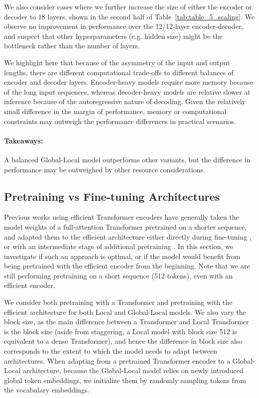 \documentclass[11pt]{article}
\begin{document}
We also consider cases where we further increase the size of either the encoder or decoder to 18 layers, shown in the second half of Table~\ref{tab:table_5_scaling}.
We observe no improvement in performance over the 12/12-layer encoder-decoder, and suspect that other hyperparameters (e.g. hidden size) might be the bottleneck rather than the number of layers.

We highlight here that because of the asymmetry of the input and output lengths, there are different computational trade-offs to different balances of encoder and decoder layers. 
Encoder-heavy models require more memory because of the long input sequences, whereas decoder-heavy models are relative slower at inference because of the autoregressive nature of decoding.
Given the relatively small difference in the margin of performance, memory or computational constraints may outweigh the performance differences in practical scenarios.

\paragraph{Takeaways:} A balanced Global-Local model outperforms other variants, but the difference in performance may be outweighed by other resource considerations.




\subsection{Pretraining vs Fine-tuning Architectures}

Previous works using efficient Transformer encoders have generally taken the model weights of a full-attention Transformer pretrained on a shorter sequence, and adapted them to the efficient architecture either directly during fine-tuning \citep{zaheer2020bigbird}, or with an intermediate stage of additional pretraining \citep{beltagy2020longformer}.
In this section, we investigate if such an approach is optimal, or if the model would benefit from being pretrained with the efficient encoder from the beginning.
Note that we are still performing pretraining on a short sequence (512 tokens), even with an efficient encoder.

We consider both pretraining with a Transformer and pretraining with the efficient architecture for both Local and Global-Local models.
We also vary the block size, as the main difference between a Transformer and Local Transformer is the block size (aside from staggering, a Local model with block size 512 is equivalent to a dense Transformer), and hence the difference in block size also corresponds to the extent to which the model needs to adapt between architectures.
When adapting from a pretrained Transformer encoder to a Global-Local architecture, because the Global-Local model relies on newly introduced global token embeddings, we initialize them by randomly sampling tokens from the vocabulary embeddings.
\end{document}
